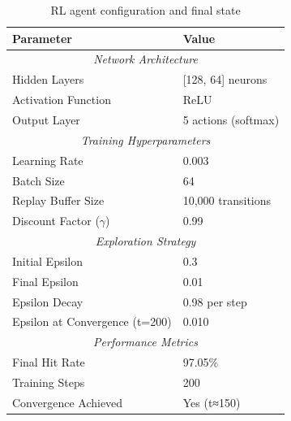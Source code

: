 \begin{table}[t]
\centering
\caption{RL agent configuration and final state}
\label{table:rl_config}
\begin{tabular}{l|l}
\hline
\rowcolor[gray]{0.9}
\textbf{Parameter} & \textbf{Value} \\
\hline
\multicolumn{2}{c}{\textit{Network Architecture}} \\
\hline
Hidden Layers & [128, 64] neurons \\
Activation Function & ReLU \\
Output Layer & 5 actions (softmax) \\
\hline
\multicolumn{2}{c}{\textit{Training Hyperparameters}} \\
\hline
Learning Rate & 0.003 \\
Batch Size & 64 \\
Replay Buffer Size & 10,000 transitions \\
Discount Factor ($\gamma$) & 0.99 \\
\hline
\multicolumn{2}{c}{\textit{Exploration Strategy}} \\
\hline
Initial Epsilon & 0.3 \\
Final Epsilon & 0.01 \\
Epsilon Decay & 0.98 per step \\
Epsilon at Convergence (t=200) & 0.010 \\
\hline
\multicolumn{2}{c}{\textit{Performance Metrics}} \\
\hline
Final Hit Rate & 97.05\% \\
Training Steps & 200 \\
Convergence Achieved & Yes (t≈150) \\
\hline
\end{tabular}
\end{table}




